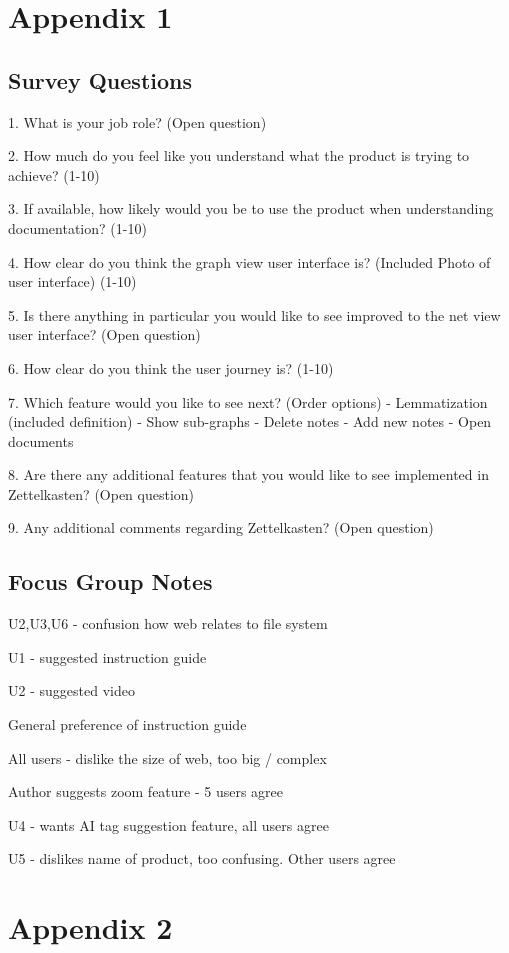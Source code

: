 \documentclass{article}
\begin{document}
\section{Appendix 1}
\label{sec:appendix-1}
{\parindent0pt
\subsection{Survey Questions}
1. What is your job role? (Open question)

2. How much do you feel like you understand what the product is trying to achieve? (1-10)

3. If available, how likely would you be to use the product when understanding documentation? (1-10)

4. How clear do you think the graph view user interface is? (Included Photo of user interface) (1-10)

5. Is there anything in particular you would like to see improved to the net view user interface? (Open question)

6. How clear do you think the user journey is? (1-10)

7. Which feature would you like to see next? (Order options)
- Lemmatization (included definition)
- Show sub-graphs
- Delete notes
- Add new notes
- Open documents

8. Are there any additional features that you would like to see implemented in Zettelkasten? (Open question)

9. Any additional comments regarding Zettelkasten? (Open question)

\subsection{Focus Group Notes}
U2,U3,U6 - confusion how web relates to file system

U1 - suggested instruction guide

U2 - suggested video

General preference of instruction guide

All users - dislike the size of web, too big / complex

Author suggests zoom feature - 5 users agree

U4 - wants AI tag suggestion feature, all users agree

U5 - dislikes name of product, too confusing. Other users agree
}

\newpage
\section{Appendix 2}
\end{document}
